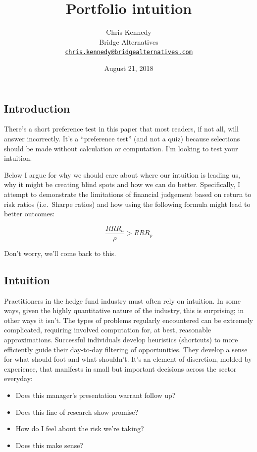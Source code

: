 \documentclass[]{article}
\title{Portfolio intuition}
\author{Chris Kennedy\\
Bridge Alternatives\\
\href{mailto:chris.kennedy@bridgealternatives.com}{\nolinkurl{chris.kennedy@bridgealternatives.com}}}
\date{August 21, 2018}
\providecommand{\tightlist}{%
  \setlength{\itemsep}{0pt}\setlength{\parskip}{0pt}}
\begin{document}
\maketitle

\hypertarget{introduction}{%
\subsection{Introduction}\label{introduction}}

There's a short preference test in this paper that most readers, if not
all, will answer incorrectly. It's a ``preference test'' (and not a
quiz) because selections should be made without calculation or
computation. I'm looking to test your intuition.

Below I argue for why we should care about where our intuition is
leading us, why it might be creating blind spots and how we can do
better. Specifically, I attempt to demonstrate the limitations of
financial judgement based on return to risk ratios (i.e.~Sharpe ratios)
and how using the following formula might lead to better outcomes:

\[
\frac{RRR_a}{\rho} > RRR_p
\]

Don't worry, we'll come back to this.

\hypertarget{intuition}{%
\subsection{Intuition}\label{intuition}}

Practitioners in the hedge fund industry must often rely on intuition.
In some ways, given the highly quantitative nature of the industry, this
is surprising; in other ways it isn't. The types of problems regularly
encountered can be extremely complicated, requiring involved computation
for, at best, reasonable approximations. Successful individuals develop
heuristics (shortcuts) to more efficiently guide their day-to-day
filtering of opportunities. They develop a sense for what should foot
and what shouldn't. It's an element of discretion, molded by experience,
that manifests in small but important decisions across the sector
everyday:

\begin{itemize}
\tightlist
\item
  Does this manager's presentation warrant follow up?
\item
  Does this line of research show promise?
\item
  How do I feel about the risk we're taking?
\item
  Does this make sense?
\end{itemize}
\end{document}
